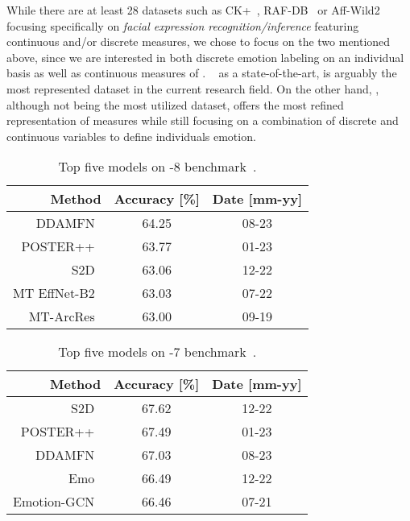While there are at least 28 datasets such as CK+~\cite{5543262}, RAF-DB~\cite{Li_2017_CVPR} or Aff-Wild2~\cite{kollias2023abaw2, kollias2023multi, kollias2022abaw, kollias2023abaw, kollias2021analysing, kollias2021affect, kollias2021distribution, kollias2020analysing, kollias_expression_2019, kollias2019deep, kollias2019face, zafeiriou2017aff, kollias2019affwild2} focusing specifically on \textit{facial expression recognition/inference} featuring continuous and/or discrete measures, we chose to focus on the two mentioned above, since we are interested in both discrete emotion labeling on an individual basis as well as continuous measures of \va{}.
\affectnet{}~\cite{mollahosseini2017affectnet} as a state-of-the-art, is arguably the most represented dataset in the current research field. 
On the other hand, \emotic{}, although not being the most utilized dataset, offers the most refined representation of measures while still focusing on a combination of discrete and continuous variables to define individuals emotion.

\begin{table}[t]
\centering
\begin{tabular}{r | c  | c }
\hline
\textbf{Method} & \textbf{Accuracy [\%]} & \textbf{Date [mm-yy]} \\
\hline
DDAMFN~\cite{electronics12173595} & 64.25 & 08-23  \\
POSTER++~\cite{mao2023poster} &63.77 & 01-23   \\
S2D~\cite{chen2023static}&63.06 & 12-22   \\
MT EffNet-B2~\cite{9815154} & 63.03 & 07-22   \\
MT-ArcRes~\cite{kollias_expression_2019} & 63.00 & 09-19   \\ \hline
\end{tabular}
\caption{Top five models on \affectnet{}-8 benchmark~\cite{paperswithcodeaff}.}
\label{tab:relatedworkaffectnet8}
\end{table}

\begin{table}[t]
\centering
\begin{tabular}{r | c  | c }
\hline
\textbf{Method} & \textbf{Accuracy [\%]} & \textbf{Date [mm-yy]} \\
\hline
S2D~\cite{chen2023static}&67.62 & 12-22   \\
POSTER++~\cite{mao2023poster} &67.49 & 01-23   \\
DDAMFN~\cite{electronics12173595} & 67.03 & 08-23  \\
Emo\affectnet{}~\cite{RYUMINA2022435} & 66.49 & 12-22  \\
Emotion-GCN~\cite{Antoniadis_2021} & 66.46 & 07-21 \\\hline
\end{tabular}
\caption{Top five models on \affectnet{}-7 benchmark~\cite{paperswithcodeaff}.}
\label{tab:relatedworkaffectnet7}
\end{table}

